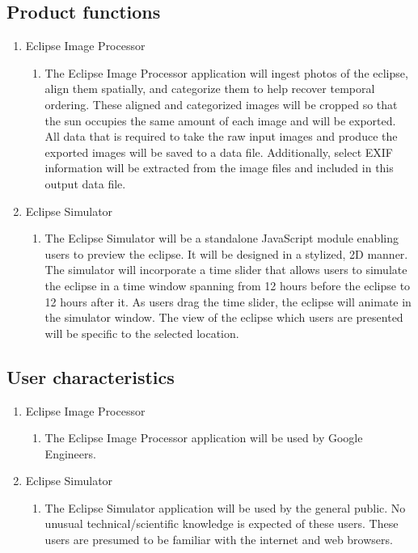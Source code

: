 \documentclass[10pt, onecolumn, draftclsnofoot, letterpaper, compsoc]{IEEEtran}
\begin{document}
\subsection{Product functions}
	\begin{enumerate}
		\item Eclipse Image Processor
		\begin{enumerate}
			\item The Eclipse Image Processor application will ingest 
			photos of the eclipse, align them spatially, and categorize
			them to help recover temporal ordering. These aligned and 
			categorized images will be cropped so that the sun 
			occupies the same amount of each image and will be 
			exported. All data that is required to take the raw input 
			images and produce the exported images will be saved to a 
			data file. Additionally, select EXIF information will be 
			extracted from the image files and included in this output
			data file.
		\end{enumerate}

		\item Eclipse Simulator
		\begin{enumerate}
			\item The Eclipse Simulator will be a standalone JavaScript 
			module enabling users to preview the eclipse. It will be 
			designed in a stylized, 2D manner. The simulator will 
			incorporate a time slider that allows users to simulate the 
			eclipse in a time window spanning from 12 hours before the 
			eclipse to 12 hours after it. As users drag the time 
			slider, the eclipse will animate in the simulator window. 
			The view of the eclipse which users are presented will be 
			specific to the selected location.
		\end{enumerate}
	\end{enumerate}

\subsection{User characteristics}
	\begin{enumerate}
		\item Eclipse Image Processor
		\begin{enumerate}
			\item The Eclipse Image Processor application will be used by 
			Google Engineers.
		\end{enumerate}

		\item Eclipse Simulator
		\begin{enumerate}
			\item The Eclipse Simulator application will be used by the
			general public. No unusual technical/scientific knowledge is
			expected of these users. These users are presumed to be
			familiar with the internet and web browsers.
		\end{enumerate}
	\end{enumerate}
\end{document}
